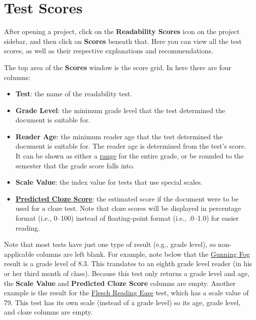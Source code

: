 \documentclass[
]{book}
\providecommand{\tightlist}{%
  \setlength{\itemsep}{0pt}\setlength{\parskip}{0pt}}
\theoremstyle{definition}
\theoremstyle{definition}
\theoremstyle{definition}
\theoremstyle{definition}
\theoremstyle{remark}
\begin{document}
\hypertarget{reviewing-test-scores}{%
\section{Test Scores}\label{reviewing-test-scores}}

After opening a project, click on the \textbf{Readability Scores} icon on the project sidebar, and then click on \textbf{Scores} beneath that. Here you can view all the test scores, as well as their respective explanations and recommendations.

The top area of the \textbf{Scores} window is the score grid. In here there are four columns:

\begin{itemize}
\tightlist
\item
  \textbf{Test}: the name of the readability test.
\item
  \textbf{Grade Level}: the minimum grade level that the test determined the document is suitable for.
\item
  \textbf{Reader Age}: the minimum reader age that the test determined the document is suitable for. The reader age is determined from the test's score. It can be shown as either a \protect\hyperlink{reading-age}{range} for the entire grade, or be rounded to the semester that the grade score falls into.
\item
  \textbf{Scale Value}: the index value for tests that use special scales.
\item
  \protect\hyperlink{cloze}{\textbf{Predicted Cloze Score}}: the estimated score if the document were to be used for a cloze test. Note that cloze scores will be displayed in percentage format (i.e., 0--100) instead of floating-point format (i.e., .0--1.0) for easier reading.
\end{itemize}

Note that most tests have just one type of result (e.g., grade level), so non-applicable columns are left blank. For example, note below that the \protect\hyperlink{gunning-fog-test}{Gunning Fog} result is a grade level of 8.3. This translates to an eighth grade level reader (in his or her third month of class). Because this test only returns a grade level and age, the \textbf{Scale Value} and \textbf{Predicted Cloze Score} columns are empty. Another example is the result for the \protect\hyperlink{flesch-test}{Flesch Reading Ease} test, which has a scale value of 79. This test has its own scale (instead of a grade level) so its age, grade level, and cloze columns are empty.
\end{document}
